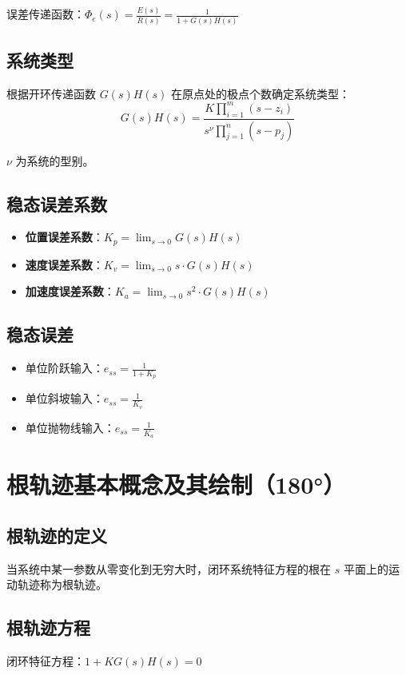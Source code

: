 \documentclass[12pt,a4paper]{article}
\begin{document}
误差传递函数：$\Phi_e(s) = \frac{E(s)}{R(s)} = \frac{1}{1 + G(s)H(s)}$

\subsection{系统类型}
根据开环传递函数 $G(s)H(s)$ 在原点处的极点个数确定系统类型：
\[G(s)H(s) = \frac{K \prod_{i=1}^{m}(s - z_i)}{s^\nu \prod_{j=1}^{n}(s - p_j)}\]

$\nu$ 为系统的型别。

\subsection{稳态误差系数}
\begin{itemize}
    \item \textbf{位置误差系数}：$K_p = \lim_{s \to 0} G(s)H(s)$
    \item \textbf{速度误差系数}：$K_v = \lim_{s \to 0} s \cdot G(s)H(s)$
    \item \textbf{加速度误差系数}：$K_a = \lim_{s \to 0} s^2 \cdot G(s)H(s)$
\end{itemize}

\subsection{稳态误差}
\begin{itemize}
    \item 单位阶跃输入：$e_{ss} = \frac{1}{1 + K_p}$
    \item 单位斜坡输入：$e_{ss} = \frac{1}{K_v}$
    \item 单位抛物线输入：$e_{ss} = \frac{1}{K_a}$
\end{itemize}

\section{根轨迹基本概念及其绘制（180°）}

\subsection{根轨迹的定义}
当系统中某一参数从零变化到无穷大时，闭环系统特征方程的根在 $s$ 平面上的运动轨迹称为根轨迹。

\subsection{根轨迹方程}
闭环特征方程：$1 + KG(s)H(s) = 0$
\end{document}
